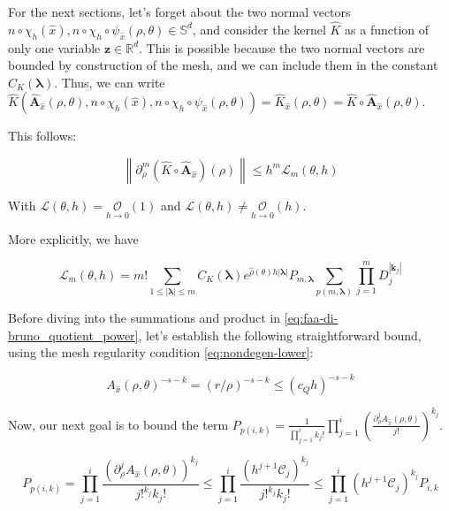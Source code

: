 ﻿\documentclass{article}
\begin{document}
For the next sections, let's forget about the two normal vectors $n\circ\chi_h(\hat x), n\circ\chi_h\circ\psi_{\hat x}(\rho,\theta)\in \mathbb S^{d}$, and consider the kernel $\hat K$ as a function of only one variable $\bm z\in\mathbb R^d$. This is possible because the two normal vectors are bounded by construction of the mesh, and we can include them in the constant $C_K(\bm\lambda)$. Thus, we can write $\hat K(\hat{\bm A}_{\hat x}(\rho, \theta), n\circ\chi_h(\hat x), n\circ\chi_h\circ\psi_{\hat x}(\rho,\theta)) = \hat K_{\hat x}(\rho, \theta) = \hat K \circ \hat{\bm A}_{\hat x}(\rho, \theta)$.

\begin{corollary}\label{corollary:regularized-kernel}
  This follows:

\begin{equation}
  \left\|\partial_\rho^m(\hat K\circ \hat{\bm A}_{\hat x})(\rho)\right\| \leq h^{m} \mathcal L_{m}(\theta, h)
\end{equation}

With $\displaystyle{\mathcal L(\theta, h) = \underset{h\to 0}{\mathcal O}(1)}$ and $\displaystyle{\mathcal L(\theta, h) \neq \underset{h\to 0}{\mathcal O}(h)}$.

More explicitly, we have 

\begin{equation}
  \mathcal L_{m}(\theta, h) = m!\sum_{1\leq|\bm\lambda|\leq m}C_K(\bm\lambda)e^{\hat\rho(\theta)h|\bm\lambda|}P_{m, \bm\lambda}\sum_{p(m, \bm\lambda)}\prod_{j=1}^{m}D_j^{|\bm k_j|}
\end{equation}
  
\end{corollary}

Before diving into the summations and product in \ref{eq:faa-di-bruno_quotient_power}, let's establish the following straightforward bound, using the mesh regularity condition \ref{eq:nondegen-lower}:

\begin{equation}
  A_{\hat x}(\rho, \theta)^{-s-k} = (r/\rho)^{-s-k} \leq (c_Qh)^{-s-k}
\end{equation}

Now, our next goal is to bound the term $\displaystyle{P_{p(i, k)} = \frac{1}{\prod_{j=1}^{i}k_j!}\prod_{j=1}^{i}\left(\frac{\partial^j_{\rho}A_{\hat x}(\rho, \theta)}{j!}\right)^{k_j}}$. 

\begin{equation}
  P_{p(i, k)} = \prod_{j=1}^{i}\frac{\left(\partial^j_{\rho}A_{\hat x}(\rho, \theta)\right)^{k_j}}{j!^{k_j}k_j!} \leq \prod_{j=1}^{i}\frac{\left(h^{j+1}\mathcal C_j\right)^{k_j}}{j!^{k_j}k_j!} \leq \prod_{j=1}^{i}\left(h^{j+1}\mathcal C_j\right)^{k_j}P_{i,k}
\end{equation}
\end{document}
